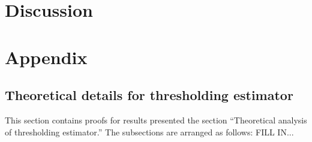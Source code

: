 \documentclass[12pt]{article}
\begin{document}
\section{Discussion}

\section{Appendix}

\subsection{Theoretical details for thresholding estimator}

This section contains proofs for results presented the section ``Theoretical analysis of thresholding estimator.'' The subsections are arranged as follows: FILL IN...
\end{document}
